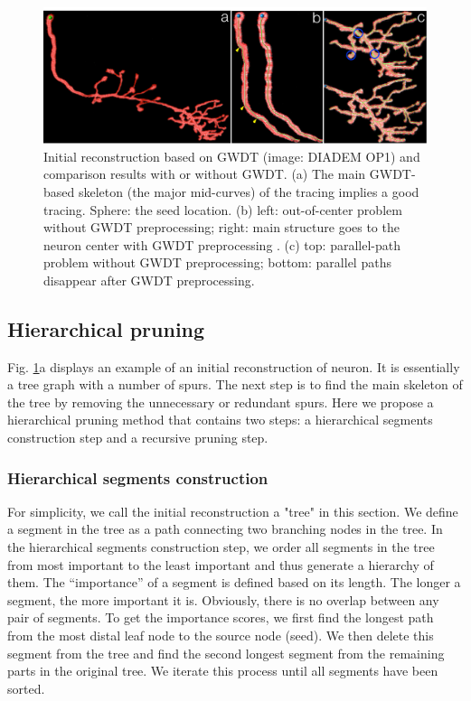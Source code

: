 \begin{figure}[htbp]
\centering
\includegraphics[width=1.0\textwidth]{images/autont_fig2}
\caption[Initial reconstruction based on GWDT and comparison results with or without GWDT]{Initial reconstruction based on GWDT (image: DIADEM OP1) and comparison results with or without GWDT. (a) The main GWDT-based skeleton (the major mid-curves) of the tracing implies a good tracing.  Sphere: the seed location. (b) left: out-of-center problem without GWDT preprocessing; right:  main structure goes to the neuron center with GWDT preprocessing . (c) top: parallel-path problem without GWDT preprocessing; bottom: parallel paths disappear after GWDT preprocessing.}
\label{fig:autont-fig2}
\end{figure}
\subsection{Hierarchical pruning}\label{sec:nt-hp}
Fig. \ref{fig:autont-fig2}a displays an example of an initial reconstruction of neuron. It is essentially a tree graph with a number of spurs. The next step is to find the main skeleton of the tree by removing the unnecessary or redundant spurs. Here we propose a hierarchical pruning method that contains two steps: a hierarchical segments construction step and a recursive pruning step. 
\subsubsection{Hierarchical segments construction}
For simplicity, we call the initial reconstruction a "tree" in this section. We define a segment in the tree as a path connecting two branching nodes in the tree. In the hierarchical segments construction step, we order all segments in the tree from most important to the least important and thus generate a hierarchy of them. The “importance” of a segment is defined based on its length. The longer a segment, the more important it is. Obviously, there is no overlap between any pair of segments. To get the importance scores, we first find the longest path from the most distal leaf node to the source node (seed). We then delete this segment from the tree and find the second longest segment from the remaining parts in the original tree. We iterate this process until all segments have been sorted. 

